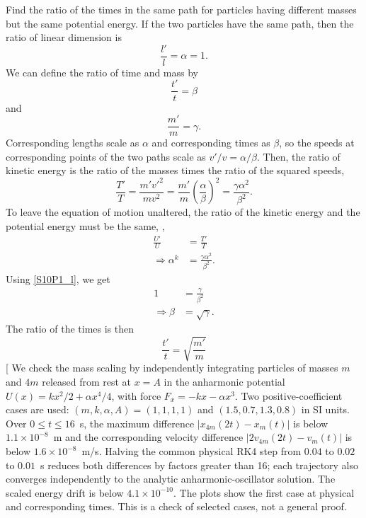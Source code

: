 \begin{problem}[title={Travel times for different masses, same path}]
{
Find the ratio of the times in the same path for particles having different masses but the same potential energy.
}
{
If the two particles have the same path, then the ratio of linear dimension is
\begin{equation} \label{S10P1_l}
    \frac{l'}{l} = \alpha = 1.
\end{equation}
We can define the ratio of time and mass by
\begin{equation*}
    \frac{t'}{t} = \beta
\end{equation*}
and
\begin{equation*}
    \frac{m'}{m} = \gamma .
\end{equation*}
Corresponding lengths scale as $\alpha$ and corresponding times as $\beta$, so the speeds at corresponding points of the two paths scale as $v'/v = \alpha/\beta$. Then, the ratio of kinetic energy is the ratio of the masses times the ratio of the squared speeds,
\begin{equation*}
    \frac{T'}{T} = \frac{m' v'^2}{m v^2} = \frac{m'}{m} \left( \frac{\alpha}{\beta} \right)^2 = \frac{\gamma \alpha^2}{\beta^2}.
\end{equation*}
To leave the equation of motion unaltered, the ratio of the kinetic energy and the potential energy must be the same, \ie,
\begin{align*}
    \frac{U'}{U} &= \frac{T'}{T} \\
    \Rightarrow \alpha^k &=  \frac{\gamma \alpha^2}{\beta^2}.
\end{align*}
Using \eqref{S10P1_l}, we get
\begin{align*}
    1 &= \frac{\gamma}{\beta^2} \\
    \Rightarrow \beta &= \sqrt{\gamma}.
\end{align*}
The ratio of the times is then
}
{
\begin{equation*}
    \frac{t'}{t} = \sqrt{\frac{m'}{m}}
\end{equation*}
}
[
We check the mass scaling by independently integrating particles of masses $m$ and $4m$ released from rest at $x=A$ in the anharmonic potential $U(x)=kx^2/2+\alpha x^4/4$, with force $F_x=-kx-\alpha x^3$. Two positive-coefficient cases are used: $(m,k,\alpha,A)=(1,1,1,1)$ and $(1.5,0.7,1.3,0.8)$ in SI units. Over $0\leq t\leq16$~s, the maximum difference $|x_{4m}(2t)-x_m(t)|$ is below $1.1\times10^{-8}$~m and the corresponding velocity difference $|2v_{4m}(2t)-v_m(t)|$ is below $1.6\times10^{-8}$~m/s. Halving the common physical RK4 step from $0.04$ to $0.02$ to $0.01$~s reduces both differences by factors greater than 16; each trajectory also converges independently to the analytic anharmonic-oscillator solution. The scaled energy drift is below $4.1\times10^{-10}$. The plots show the first case at physical and corresponding times. This is a check of selected cases, not a general proof.

\end{problem}
